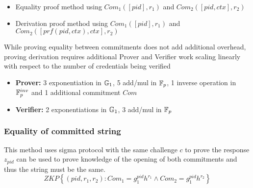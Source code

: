 \begin{itemize}
    \item Equality proof method using $Com_1([pid],r_1)$ and $Com_2([pid,ctx],r_2)$
    \item Derivation proof method using $Com_1([pid],r_1)$ and $Com_2([prf(pid,ctx),ctx],r_2)$
\end{itemize}

While proving equality between commitments does not add additional overhead, proving derivation requires additional Prover and Verifier work scaling linearly with respect to the number of credentials being verified
\begin{itemize}
    \item \textbf{Prover:} 3 exponentiation in $\mathbb{G}_1$, 5 add/mul in $\mathbb{F}_p$, 1 inverse operation in $\mathbb{F}_p^{inv}$ and 1 additional commitment $Com$
    \item \textbf{Verifier:} 2 exponentiations in $\mathbb{G}_1$, 3 add/mul in $\mathbb{F}_p$
\end{itemize}

\subsubsection{Equality of committed string}
This method uses sigma protocol with the same challenge $c$ to prove the response $z_{pid}$ can be used to prove knowledge of the opening of both commitments and thus the string must be the same.
\[
ZKP
    \left\{ 
    (pid, r_1, r_2): Com_1 = g_1^{pid} h^{r_1} \wedge Com_2 = g_1^{pid} h^{r_2}
    \right\}
\]


